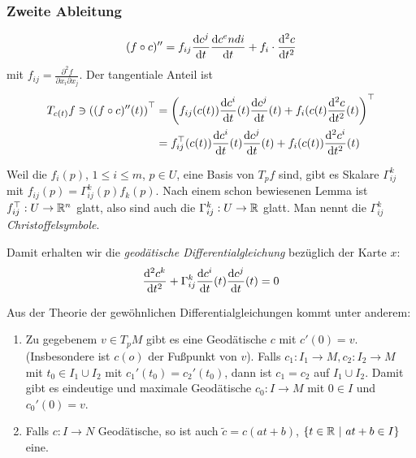 \documentclass{skript}
\begin{document}
\subsubsection{Zweite Ableitung}
\begin{align*}
  (f\circ c)'' = f_{ij}\frac{\mathrm d c^j}{\mathrm d t}\frac{\mathrm d c^endi}{\mathrm d t} + f_i \cdot
  \frac{\mathrm d^2c}{\mathrm d t^2}
\end{align*}
mit $f_{ij} = \frac{\partial^2 f}{\partial x_i\partial x_j}$. Der tangentiale
Anteil ist
\begin{align*}
  T_{c(t)}f \ni \left( (f\circ c)''(t) \right)^\top &=
  \left( f_{ij}(c(t))\frac{\mathrm d c^i}{\mathrm d t}(t)\frac{\mathrm d c^j}{\mathrm d t}(t) +
  f_i(c(t)\frac{\mathrm d^2 c}{\mathrm d t^2}(t) \right)^\top \\
  &= f_{ij}^\top(c(t)) \frac{\mathrm d c^i}{\mathrm d t}(t) \frac{\mathrm d c^j}{\mathrm d t}(t) + f_i(c(t))
  \frac{\mathrm d^2 c^i}{\mathrm d t^2}(t)
\end{align*}

Weil die $f_i(p)$, $1\le i\le m$, $p\in U$, eine Basis von $T_pf$ sind, gibt es
Skalare $\Gamma^k_{ij}$ mit $f_{ij}(p) = \Gamma^k_{ij}(p)f_k(p)$. Nach einem
schon bewiesenen Lemma ist $f_{ij}^\top:U\to\mathbb{R}^n$ glatt, also sind auch die
$\Gamma^k_{ij}:U\to\mathbb{R}$ glatt. Man nennt die $\Gamma_{ij}^k$
\emph{Christoffelsymbole}.

Damit erhalten wir die \emph{geodätische Differentialgleichung} bezüglich der
Karte $x$:
\begin{align*}
  \frac{\mathrm d^2c^k}{\mathrm d t^2} + \Gamma^k_{ij}\frac{\mathrm d c^i}{\mathrm d t}(t)
  \frac{\mathrm d c^j}{\mathrm d t}(t) = 0
\end{align*}

Aus der Theorie der gewöhnlichen Differentialgleichungen kommt unter anderem:
\begin{enumerate}
  \item Zu gegebenem $v \in T_pM$ gibt es eine Geodätische $c$ mit $c'(0)=v$.
    (Insbesondere ist $c(o)$ der Fußpunkt von $v$). Falls $c_1: I_1 \to M, c_2:
    I_2\to M$ mit $t_0 \in I_1\cup I_2$ mit $c_1'(t_0)=c_2'(t_0)$, dann ist
    $c_1=c_2$ auf $I_1\cup I_2$. Damit gibt es eindeutige und maximale Geodätische
    $c_0:I\to M$ mit $0\in I$ und $c_0'(0)=v$.
  \item Falls $c: I \to N$ Geodätische, so ist auch $\tilde{c}=c(at+b)$, 
    $\mdef[t\in\R]{at+b\in I}$ eine.
\end{enumerate}
\end{document}
